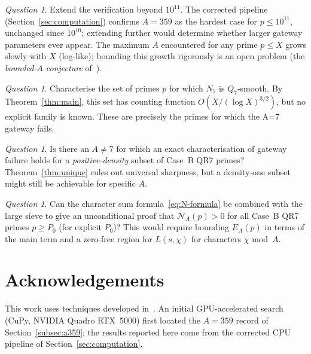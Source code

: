\documentclass[12pt]{amsart}
\theoremstyle{definition}
\theoremstyle{remark}
\newtheorem{question}[theorem]{Question}
\begin{document}
\begin{question}
Extend the verification beyond $10^{11}$. The corrected pipeline
(Section~\ref{sec:computation}) confirms $A = 359$ as the hardest case
for $p \le 10^{11}$, unchanged since $10^{10}$; extending further would
determine whether larger gateway parameters ever appear. The maximum
$A$ encountered for any prime $p \le X$ grows slowly with $X$
(log-like); bounding this growth rigorously is an open problem (the
\emph{bounded-$A$ conjecture} of~\cite{ES-paper}).
\end{question}

\begin{question}
Characterise the set of primes $p$ for which $N_7$ is $Q_7$-smooth.
By Theorem~\ref{thm:main}, this set has counting function
$O(X/(\log X)^{3/2})$, but no explicit family is known.
These are precisely the primes for which the A=7 gateway fails.
\end{question}

\begin{question}
Is there an $A \ne 7$ for which an exact characterisation of gateway
failure holds for a \emph{positive-density} subset of Case~B QR7 primes?
Theorem~\ref{thm:unique} rules out universal sharpness, but
a density-one subset might still be achievable for specific $A$.
\end{question}

\begin{question}
Can the character sum formula~\eqref{eq:N-formula} be combined with
the large sieve to give an unconditional proof that $\mathcal{N}_A(p) > 0$
for all Case~B QR7 primes $p \ge P_0$ (for explicit $P_0$)?
This would require bounding $E_A(p)$ in terms of the main term
and a zero-free region for $L(s, \chi)$ for characters $\chi$ mod~$A$.
\end{question}

\section*{Acknowledgements}

This work uses techniques developed in~\cite{ES-paper,closure-paper}.
An initial GPU-accelerated search (CuPy, NVIDIA Quadro RTX~5000) first
located the $A = 359$ record of Section~\ref{subsec:a359}; the results
reported here come from the corrected CPU pipeline of
Section~\ref{sec:computation}.
\end{document}

